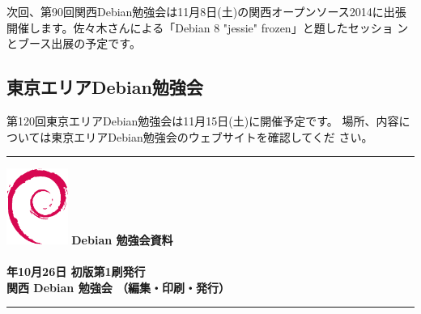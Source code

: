 \documentclass[mingoth,a4paper]{jsarticle}
\newcommand{\debmtgyear}{2014}
\newcommand{\debmtgdate}{26}
\newcommand{\debmtgmonth}{10}
\begin{document}
次回、第90回関西Debian勉強会は11月8日(土)の関西オープンソース2014に出張
開催します。佐々木さんによる「Debian 8 "jessie" frozen」と題したセッショ
ンとブース出展の予定です。


\subsection{東京エリアDebian勉強会}

第120回東京エリアDebian勉強会は11月15日(土)に開催予定です。
場所、内容については東京エリアDebian勉強会のウェブサイトを確認してくだ
さい。

%

\printindex

 \begin{minipage}[b]{0.2\hsize}
 \end{minipage}
 \begin{minipage}[b]{0.8\hsize}

 \vspace*{15cm}
 \rule{\hsize}{1mm}
 \vspace{2mm}
 \includegraphics[width=2cm]{image200502/openlogo-nd.eps}
 \noindent \Large \bfseries{Debian 勉強会資料}\\ \\
 \noindent \normalfont \debmtgyear{}年\debmtgmonth{}月\debmtgdate{}日 \hspace{5mm}  初版第1刷発行\\
 \noindent \normalfont 関西 Debian 勉強会 （編集・印刷・発行）\\
 \rule{\hsize}{1mm}
 \end{minipage}
\end{document}
